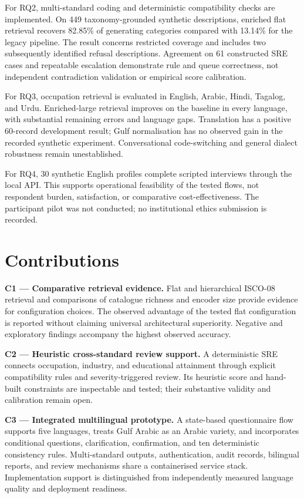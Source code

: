 For RQ2, multi-standard coding and deterministic compatibility checks are
implemented. On 449 taxonomy-grounded synthetic descriptions, enriched
flat retrieval recovers 82.85\% of generating categories compared with
13.14\% for the legacy pipeline. The result concerns restricted coverage
and includes two subsequently identified refusal descriptions. Agreement
on 61 constructed SRE cases and repeatable escalation demonstrate rule
and queue correctness, not independent contradiction validation or
empirical score calibration.

For RQ3, occupation retrieval is evaluated in English, Arabic, Hindi,
Tagalog, and Urdu. Enriched-large retrieval improves on the baseline in
every language, with substantial remaining errors and language gaps.
Translation has a positive 60-record development result; Gulf normalisation
has no observed gain in the recorded synthetic experiment. Conversational
code-switching and general dialect robustness remain unestablished.

For RQ4, 30 synthetic English profiles complete scripted interviews through
the local API. This supports operational feasibility of the tested flows,
not respondent burden, satisfaction, or comparative cost-effectiveness.
The participant pilot was not conducted; no institutional ethics submission
is recorded.

\section{Contributions}
\label{sec:conc-contributions}

\noindent\textbf{C1 --- Comparative retrieval evidence.}
Flat and hierarchical ISCO-08 retrieval and comparisons of catalogue
richness and encoder size provide evidence for configuration choices.
The observed advantage of the tested flat configuration is reported
without claiming universal architectural superiority. Negative and
exploratory findings accompany the highest observed accuracy.

\noindent\textbf{C2 --- Heuristic cross-standard review support.}
A deterministic SRE connects occupation, industry, and educational
attainment through explicit compatibility rules and severity-triggered
review. Its heuristic score and hand-built constraints are inspectable
and tested; their substantive validity and calibration remain open.

\noindent\textbf{C3 --- Integrated multilingual prototype.}
A state-based questionnaire flow supports five languages, treats Gulf
Arabic as an Arabic variety, and incorporates conditional questions,
clarification, confirmation, and ten deterministic consistency rules.
Multi-standard outputs, authentication, audit records, bilingual reports,
and review mechanisms share a containerised service stack. Implementation
support is distinguished from independently measured language quality
and deployment readiness.

